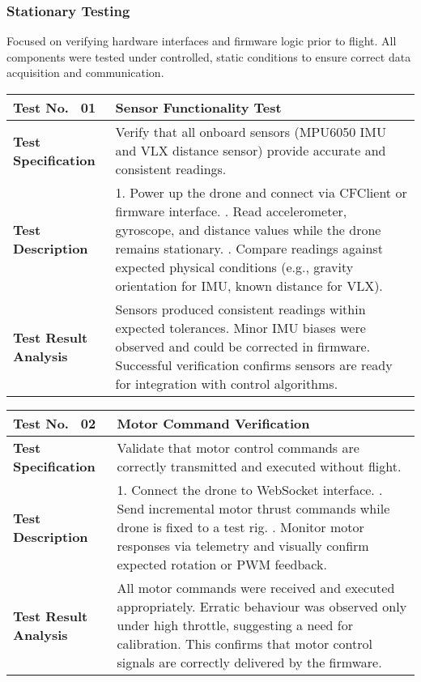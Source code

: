 \subsubsection{Stationary Testing} \leavevmode

Focused on verifying hardware interfaces and firmware logic prior to flight. All components were tested under controlled, static conditions to ensure correct data acquisition and communication.

\begin{table}[H]
\centering
\renewcommand{\arraystretch}{1.2}
\begin{tabular}{|p{3.5cm}|p{12cm}|}
\hline
\textbf{Test No. \, 01} & \textbf{Sensor Functionality Test} \\ \hline
\textbf{Test Specification} & 
Verify that all onboard sensors (MPU6050 IMU and VLX distance sensor) provide accurate and consistent readings. \\ \hline
\textbf{Test Description} & 
1. Power up the drone and connect via CFClient or firmware interface. \newline
2. Read accelerometer, gyroscope, and distance values while the drone remains stationary. \newline
3. Compare readings against expected physical conditions (e.g., gravity orientation for IMU, known distance for VLX). \\ \hline
\textbf{Test Result Analysis} & 
Sensors produced consistent readings within expected tolerances. Minor IMU biases were observed and could be corrected in firmware. Successful verification confirms sensors are ready for integration with control algorithms. \\ \hline
\end{tabular}
\end{table}

\begin{table}[H]
\centering
\renewcommand{\arraystretch}{1.2}
\begin{tabular}{|p{3.5cm}|p{12cm}|}
\hline
\textbf{Test No. \, 02} & \textbf{Motor Command Verification} \\ \hline
\textbf{Test Specification} & 
Validate that motor control commands are correctly transmitted and executed without flight. \\ \hline
\textbf{Test Description} & 
1. Connect the drone to WebSocket interface. \newline
2. Send incremental motor thrust commands while drone is fixed to a test rig. \newline
3. Monitor motor responses via telemetry and visually confirm expected rotation or PWM feedback. \\ \hline
\textbf{Test Result Analysis} & 
All motor commands were received and executed appropriately. Erratic behaviour was observed only under high throttle, suggesting a need for calibration. This confirms that motor control signals are correctly delivered by the firmware. \\ \hline
\end{tabular}
\end{table}

